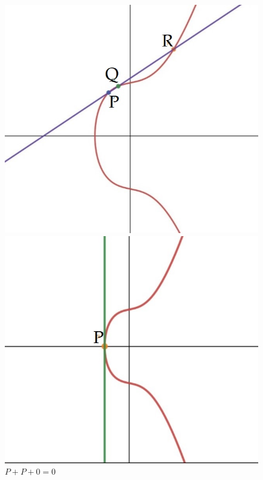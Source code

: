 \documentclass{article}
\begin{document}
\begin{figure}[hb]
  \centering
  \begin{minipage}[hb]{0.31\textwidth}
    \includegraphics[width=\textwidth]{PQR1.jpeg}
    \caption{       \(P+Q+R=0\)}
  \end{minipage}
  \hfill
  \begin{minipage}[hb]{0.31\textwidth}
    \includegraphics[width=\textwidth]{P.jpeg}
    \caption{  \(P+P+0=0\)}
  \end{minipage}
  

\end{figure}
\end{document}
